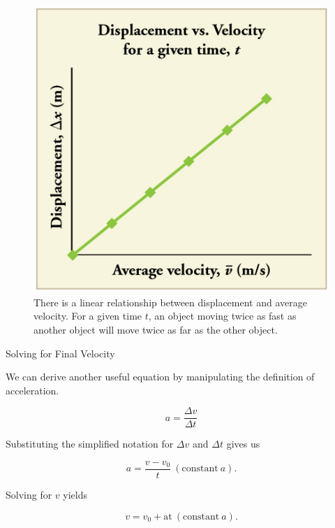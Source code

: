 \documentclass[
]{book}
\newenvironment{note}{}{}
\begin{document}
\begin{figure}
\hypertarget{import-auto-id1962019}{%
\centering
\includegraphics{images/Figure_02_05_00b.jpg}
\caption{There is a linear relationship between displacement and average
velocity. For a given time \(t{}\), an object moving twice as fast as
another object will move twice as far as the other
object.}\label{import-auto-id1962019}
}
\end{figure}

\hypertarget{fs-id1164906431223}{}
\begin{note}

Solving for Final Velocity

We can derive another useful equation by manipulating the definition of
acceleration.

\leavevmode\hypertarget{import-auto-id2366011}{}%
\[a = \frac{\Delta v}{\Delta t}\]

Substituting the simplified notation for \({\Delta v}{}\) and \(\Delta t\)
gives us

\leavevmode\hypertarget{import-auto-id1962571}{}%
\[{{a = \frac{v - v_{0}}{t}}\ (\text{constant}\ a)\text{.}}{}\]

Solving for \(v{}\) yields

\leavevmode\hypertarget{import-auto-id2168495}{}%
\[{{v = {v_{0} + \text{at}}}\ (\text{constant}\ a)\text{.}}{}\]

\end{note}
\end{document}
